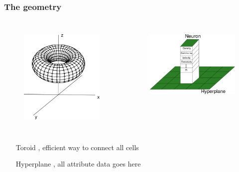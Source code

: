 \documentclass[aspectratio=10]{beamer} %
\begin{document}
\begin{frame}
\frametitle{The geometry}

\begin{columns}
\begin{figure}[H]
\flushleft
\includegraphics[scale=0.2]{Imagens/toro.png}
\label{toro}
\end{figure}
\begin{figure}
\flushright
\includegraphics[scale=0.3]{Imagens/hiperplano.png}
\label{hiperplano}
\end{figure}
\end{columns}
\pause
\begin{itemize}
	\footnotesize
	\centering
	\item[Toroid], efficient way to connect all cells
	\item[Hyperplane], all attribute data goes here
\end{itemize}
\end{frame}
\end{document}

